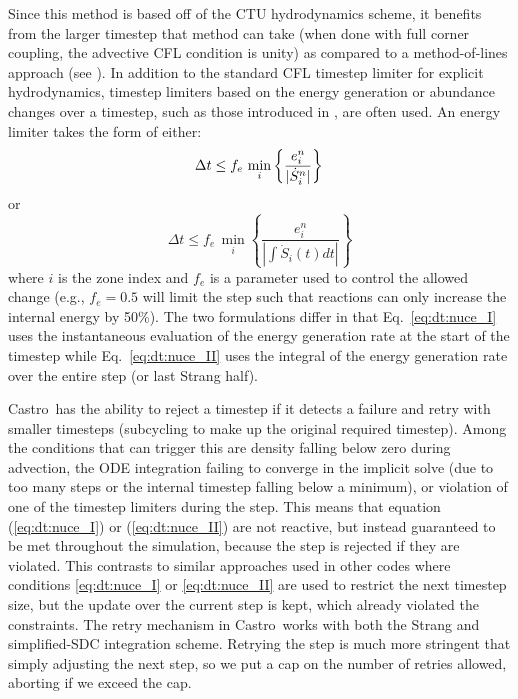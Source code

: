 \documentclass{aastex63}
\newcommand{\castro}{{\sf Castro}}
\newcommand{\MarginPar}[1]{\marginpar{\vskip-\baselineskip\raggedright\tiny\sffamily\hrule\smallskip{\color{red}#1}\par\smallskip\hrule}}
\begin{document}
Since this method is based off of the CTU hydrodynamics scheme, it
benefits from the larger timestep that method can take (when done with
full corner coupling, the advective CFL condition is unity) as
compared to a method-of-lines approach (see \citealt{ppmunsplit}).  In
addition to the standard CFL timestep limiter for explicit
hydrodynamics, timestep limiters based on
the energy generation or abundance changes over a timestep, such as
those introduced in \cite{prometheus}, are often used.  An energy limiter takes the
form of either:
\begin{equation}
\label{eq:dt:nuce_I}
\Delta t \le f_e\, \min_{i} \left\{\frac{e^n_{i}}{|\dot{S}_{i}^n|}\right\} \\
\end{equation}
or
\begin{equation}
\label{eq:dt:nuce_II}
\Delta t \le f_e\, \min_{i} \left\{ \frac{e^n_i}{|\int \dot{S}_i(t) dt|} \right\}
\end{equation}
where $i$ is the zone index and $f_e$ is a parameter used to control
the allowed change (e.g., $f_e = 0.5$ will limit the step such that
reactions can only increase the internal energy by 50\%).  The two
formulations differ in that Eq.~\ref{eq:dt:nuce_I} uses the
instantaneous evaluation of the energy generation rate at the start of
the timestep while Eq.~\ref{eq:dt:nuce_II} uses the integral of the
energy generation rate over the entire step (or last Strang half).

\castro\ has the ability to reject a timestep if it detects a failure
and retry with smaller timesteps (subcycling to make up the original
required timestep).  Among the conditions that can trigger this are
density falling below zero during advection, the ODE integration
failing to converge in the implicit solve (due to too many steps or
the internal timestep falling below a minimum), or violation of one of
the timestep limiters during the step.  This means that equation
(\ref{eq:dt:nuce_I}) or (\ref{eq:dt:nuce_II}) are not reactive, but
instead guaranteed to be met throughout the simulation, because the
step is rejected if they are violated.  This contrasts to similar
approaches used in other codes where conditions \ref{eq:dt:nuce_I} or
\ref{eq:dt:nuce_II} are used to restrict the next timestep size, but
the update over the current step is kept, which already violated the
constraints. \MarginPar{would be nice to have a reference here} The
retry mechanism in \castro\ works with both the Strang and
simplified-SDC integration scheme.  Retrying the step is much more
stringent that simply adjusting the next step, so we put a cap on the
number of retries allowed, aborting if we exceed the cap.
\end{document}
